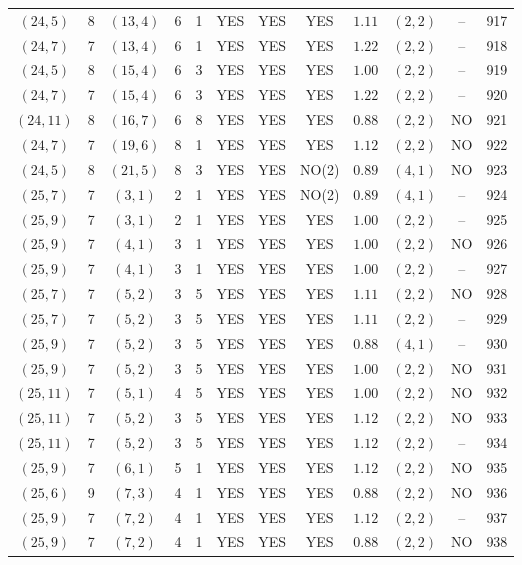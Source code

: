 \begin{longtable}{|c|c|c|c|c|c|c|c|c|c|c|c|}
$(24,5)$ & 8 & $(13,4)$ & 6 & 1 & YES & YES & YES & $1.11$ & $(2,2)$ & -- & 917\\
$(24,7)$ & 7 & $(13,4)$ & 6 & 1 & YES & YES & YES & $1.22$ & $(2,2)$ & -- & 918\\
$(24,5)$ & 8 & $(15,4)$ & 6 & 3 & YES & YES & YES & $1.00$ & $(2,2)$ & -- & 919\\
$(24,7)$ & 7 & $(15,4)$ & 6 & 3 & YES & YES & YES & $1.22$ & $(2,2)$ & -- & 920\\
$(24,11)$ & 8 & $(16,7)$ & 6 & 8 & YES & YES & YES & $0.88$ & $(2,2)$ & NO & 921\\
$(24,7)$ & 7 & $(19,6)$ & 8 & 1 & YES & YES & YES & $1.12$ & $(2,2)$ & NO & 922\\
$(24,5)$ & 8 & $(21,5)$ & 8 & 3 & YES & YES & NO(2) & $0.89$ & $(4,1)$ & NO & 923\\
$(25,7)$ & 7 & $(3,1)$ & 2 & 1 & YES & YES & NO(2) & $0.89$ & $(4,1)$ & -- & 924\\
$(25,9)$ & 7 & $(3,1)$ & 2 & 1 & YES & YES & YES & $1.00$ & $(2,2)$ & -- & 925\\
$(25,9)$ & 7 & $(4,1)$ & 3 & 1 & YES & YES & YES & $1.00$ & $(2,2)$ & NO & 926\\
$(25,9)$ & 7 & $(4,1)$ & 3 & 1 & YES & YES & YES & $1.00$ & $(2,2)$ & -- & 927\\
$(25,7)$ & 7 & $(5,2)$ & 3 & 5 & YES & YES & YES & $1.11$ & $(2,2)$ & NO & 928\\
$(25,7)$ & 7 & $(5,2)$ & 3 & 5 & YES & YES & YES & $1.11$ & $(2,2)$ & -- & 929\\
$(25,9)$ & 7 & $(5,2)$ & 3 & 5 & YES & YES & YES & $0.88$ & $(4,1)$ & -- & 930\\
$(25,9)$ & 7 & $(5,2)$ & 3 & 5 & YES & YES & YES & $1.00$ & $(2,2)$ & NO & 931\\
$(25,11)$ & 7 & $(5,1)$ & 4 & 5 & YES & YES & YES & $1.00$ & $(2,2)$ & NO & 932\\
$(25,11)$ & 7 & $(5,2)$ & 3 & 5 & YES & YES & YES & $1.12$ & $(2,2)$ & NO & 933\\
$(25,11)$ & 7 & $(5,2)$ & 3 & 5 & YES & YES & YES & $1.12$ & $(2,2)$ & -- & 934\\
$(25,9)$ & 7 & $(6,1)$ & 5 & 1 & YES & YES & YES & $1.12$ & $(2,2)$ & NO & 935\\
$(25,6)$ & 9 & $(7,3)$ & 4 & 1 & YES & YES & YES & $0.88$ & $(2,2)$ & NO & 936\\
$(25,9)$ & 7 & $(7,2)$ & 4 & 1 & YES & YES & YES & $1.12$ & $(2,2)$ & -- & 937\\
$(25,9)$ & 7 & $(7,2)$ & 4 & 1 & YES & YES & YES & $0.88$ & $(2,2)$ & NO & 938\\

\end{longtable}
